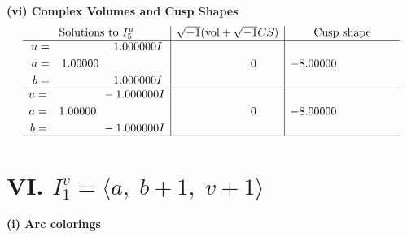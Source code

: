 \documentclass[1p]{elsarticle_modified}
\theoremstyle{definition}
\newcommand{\I}{\sqrt{-1}}
\begin{document}
\newpage\flushleft \textbf{(vi) Complex Volumes and Cusp Shapes}
$$\begin{array}{c|c|c}  
\text{Solutions to }I^u_{5}& \I (\text{vol} + \sqrt{-1}CS) & \text{Cusp shape}\\
 \hline 
\begin{aligned}
u &= \phantom{-0.000000 -}1.000000 I \\
a &= \phantom{-}1.00000\phantom{ +0.000000I} \\
b &= \phantom{-0.000000 -}1.000000 I\end{aligned}
 & \phantom{-0.000000 } 0 & -8.00000\phantom{ +0.000000I} \\ \hline\begin{aligned}
u &= \phantom{-0.000000 } -1.000000 I \\
a &= \phantom{-}1.00000\phantom{ +0.000000I} \\
b &= \phantom{-0.000000 } -1.000000 I\end{aligned}
 & \phantom{-0.000000 } 0 & -8.00000\phantom{ +0.000000I}\\
 \hline 
 \end{array}$$\newpage\newpage\renewcommand{\arraystretch}{1}
\centering \section*{VI. $I^v_{1}= \langle a,\;b+1,\;v+1 \rangle$}
\flushleft \textbf{(i) Arc colorings}\\
\end{document}
